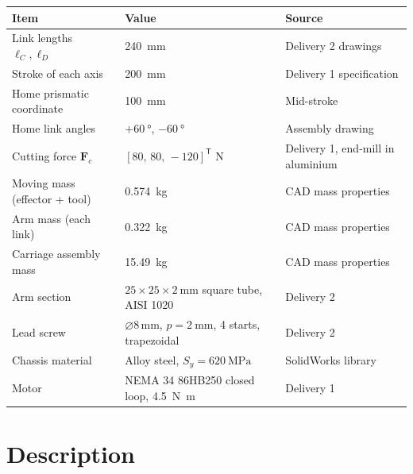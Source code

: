\documentclass[11pt]{article}
\def\calculo{ }
\def\nombre{Group 2}
\newcommand{\sheet}[2]{\clearpage\def\calculo{#1}\def\nombre{#2}}
\begin{document}
\begin{center}\small
\begin{tabular}{@{}>{\raggedright\arraybackslash}p{5.1cm}>{\raggedright\arraybackslash}p{5.6cm}>{\raggedright\arraybackslash}p{5.4cm}@{}}
\toprule
\textbf{Item} & \textbf{Value} & \textbf{Source} \\
\midrule
Link lengths $\ell_C,\ell_D$      & \SI{240}{\milli\metre}          & Delivery 2 drawings \\
Stroke of each axis               & \SI{200}{\milli\metre}          & Delivery 1 specification \\
Home prismatic coordinate         & \SI{100}{\milli\metre}          & Mid-stroke \\
Home link angles                  & $+\SI{60}{\degree}$, $-\SI{60}{\degree}$ & Assembly drawing \\
Cutting force $\bm F_c$           & $[80,\,80,\,-120]^{\mathsf T}$ \si{\newton} & Delivery 1, end-mill in aluminium \\
Moving mass (effector + tool)     & \SI{0.574}{\kilo\gram}          & CAD mass properties \\
Arm mass (each link)              & \SI{0.322}{\kilo\gram}          & CAD mass properties \\
Carriage assembly mass            & \SI{15.49}{\kilo\gram}          & CAD mass properties \\
Arm section                       & $25\times25\times\SI{2}{\milli\metre}$ square tube, AISI 1020 & Delivery 2 \\
Lead screw                        & $\varnothing$8\,mm, $p=\SI{2}{\milli\metre}$, 4 starts, trapezoidal & Delivery 2 \\
Chassis material                  & Alloy steel, $S_y=\SI{620}{\mega\pascal}$ & SolidWorks library \\
Motor                             & NEMA 34 86HB250 closed loop, \SI{4.5}{\newton\metre} & Delivery 1 \\
\bottomrule
\end{tabular}
\end{center}

\sheet{Sheet 1 -- Kinematic analysis}{D. Amell / D. Zuluaga}
\section{Description}\label{sec:kin-desc}
\end{document}
